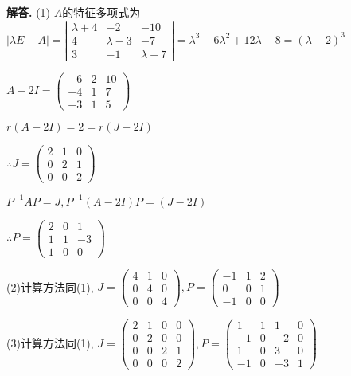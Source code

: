 \documentclass[12pt, a4paper, oneside]{ctexart}
\newcounter{problemname}
\newenvironment{solution}{\par\noindent\textbf{解答. }}{\par}
\newenvironment{note}{\par\noindent\textbf{题目\arabic{problemname}的注记. }}{\par}
\begin{document}
\begin{solution}
   (1) $A$的特征多项式为$\left|\lambda E-A\right|=\left|\begin{array}{ccc}\lambda+4 & -2 & -10 \\ 4 & \lambda-3 & -7 \\ 3 & -1 & \lambda-7\end{array}\right|=\lambda^{3}-6 \lambda^{2}+12\lambda-8=(\lambda-2)^3$

    $A-2I=\begin{pmatrix}
        -6 & 2 & 10 \\
        -4 & 1 & 7 \\
        -3 & 1 & 5
    \end{pmatrix}$

    $r(A-2I)=2=r(J-2I)$

    $\therefore J=\begin{pmatrix}
        2 & 1 & 0 \\
        0 & 2 & 1 \\
        0 & 0 & 2
    \end{pmatrix}$

    $P^{-1}AP=J,P^{-1}(A-2I)P=(J-2I)$

    $\therefore
    P=\begin{pmatrix}
        2 & 0 & 1 \\
        1 & 1 & -3 \\
        1 & 0 & 0
    \end{pmatrix}$

    (2)计算方法同(1),
    $J=\begin{pmatrix}
        4 & 1 & 0 \\
        0 & 4 & 0 \\
        0 & 0 & 4
    \end{pmatrix},
    P=\begin{pmatrix}
        -1 & 1 & 2 \\
        0 & 0 & 1 \\
        -1 & 0 & 0
    \end{pmatrix}    
    $

    (3)计算方法同(1),
    $J=\begin{pmatrix}
        2 & 1 & 0 & 0 \\
        0 & 2 & 0 & 0 \\
        0 & 0 & 2 & 1 \\
        0 & 0 & 0 & 2
    \end{pmatrix},
    P=\begin{pmatrix}
        1 & 1 & 1 & 0 \\
        -1 & 0 & -2 & 0 \\
        1 & 0 & 3 & 0 \\
        -1 & 0 & -3 & 1
    \end{pmatrix}
    $


\end{solution}

\end{document}
